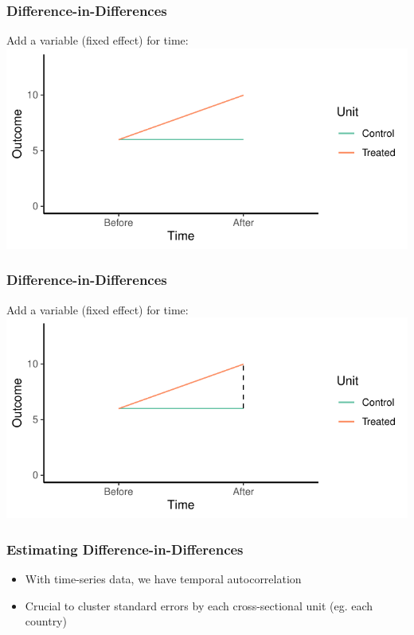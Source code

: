 \documentclass[xcolor=x11names,compress]{beamer}\usepackage[]{graphicx}\usepackage[]{color}
\makeatletter
\def\maxwidth{ %
  \ifdim\Gin@nat@width>\linewidth
    \linewidth
  \else
    \Gin@nat@width
  \fi
}
\newenvironment{knitrout}{}{} %
\renewcommand{\(}{\begin{columns}}
\renewcommand{\)}{\end{columns}}
\newcommand{\<}[1]{\begin{column}{#1}}
\renewcommand{\>}{\end{column}}
\makeatother
\begin{document}
\begin{frame}
\frametitle{Difference-in-Differences}
Add a variable (fixed effect) for time:
\begin{knitrout}
\color{fgcolor}
\includegraphics[width=\maxwidth]{figure/DinD_chart4-1} 

\end{knitrout}
\end{frame}

\begin{frame}
\frametitle{Difference-in-Differences}
Add a variable (fixed effect) for time:
\begin{knitrout}
\color{fgcolor}
\includegraphics[width=\maxwidth]{figure/DinD_chart5-1} 

\end{knitrout}
\end{frame}

\begin{frame}
\frametitle{Estimating Difference-in-Differences}
\begin{itemize}
\item With time-series data, we have temporal autocorrelation
\pause
\item Crucial to cluster standard errors by each cross-sectional unit (eg. each country)
\end{itemize}
\end{frame}
\end{document}
